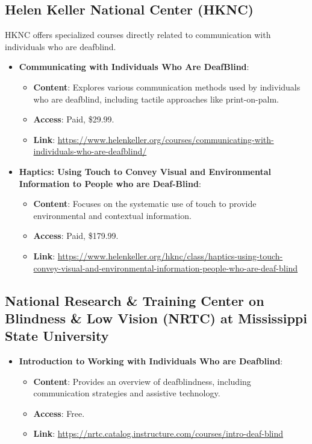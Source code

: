 \subsection{Helen Keller National Center (HKNC)}
HKNC offers specialized courses directly related to communication with individuals who are deafblind.
\begin{itemize}
    \item \textbf{Communicating with Individuals Who Are DeafBlind}:
    \begin{itemize}
        \item \textbf{Content}: Explores various communication methods used by individuals who are deafblind, including tactile approaches like print-on-palm.
        \item \textbf{Access}: Paid, \$29.99.
        \item \textbf{Link}: \url{https://www.helenkeller.org/courses/communicating-with-individuals-who-are-deafblind/}
    \end{itemize}
    \item \textbf{Haptics: Using Touch to Convey Visual and Environmental Information to People who are Deaf-Blind}:
    \begin{itemize}
        \item \textbf{Content}: Focuses on the systematic use of touch to provide environmental and contextual information.
        \item \textbf{Access}: Paid, \$179.99.
        \item \textbf{Link}: \url{https://www.helenkeller.org/hknc/class/haptics-using-touch-convey-visual-and-environmental-information-people-who-are-deaf-blind}
    \end{itemize}
\end{itemize}

\subsection{National Research \& Training Center on Blindness \& Low Vision (NRTC) at Mississippi State University}
\begin{itemize}
    \item \textbf{Introduction to Working with Individuals Who are Deafblind}:
    \begin{itemize}
        \item \textbf{Content}: Provides an overview of deafblindness, including communication strategies and assistive technology.
        \item \textbf{Access}: Free.
        \item \textbf{Link}: \url{https://nrtc.catalog.instructure.com/courses/intro-deaf-blind}
    \end{itemize}
\end{itemize}

